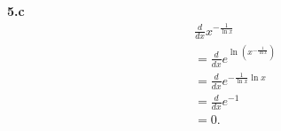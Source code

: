 \documentclass{report}
\begin{document}
    \bigbreak \noindent 
    \textbf{5.c}
    \bigbreak \noindent 
    \begin{align*}
        &\frac{d}{dx}x^{-\frac{1}{\ln{x}}} \\
        &=\frac{d}{dx}e^{\ln{\left(x^{-\frac{1}{\ln{x}}}\right)}} \\
        &=\frac{d}{dx}e^{-\frac{1}{\ln{x}}\ln{x}} \\
        &=\frac{d}{dx}e^{-1} \\
        &= 0
    .\end{align*}



    
    
\end{document}
